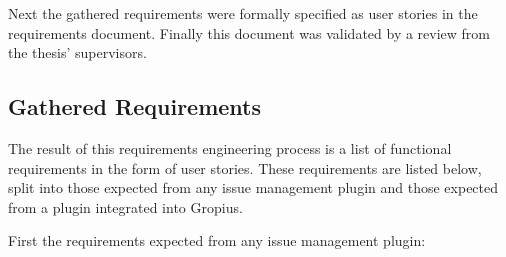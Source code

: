 Next the gathered requirements were formally specified as user stories in the requirements document.
Finally this document was validated by a review from the thesis' supervisors.


\subsection*{Gathered Requirements}
The result of this requirements engineering process is a list of functional requirements in the form of user stories.
These requirements are listed below, split into those expected from any issue management plugin and those expected from a plugin integrated into Gropius.


First the requirements expected from any issue management plugin:
